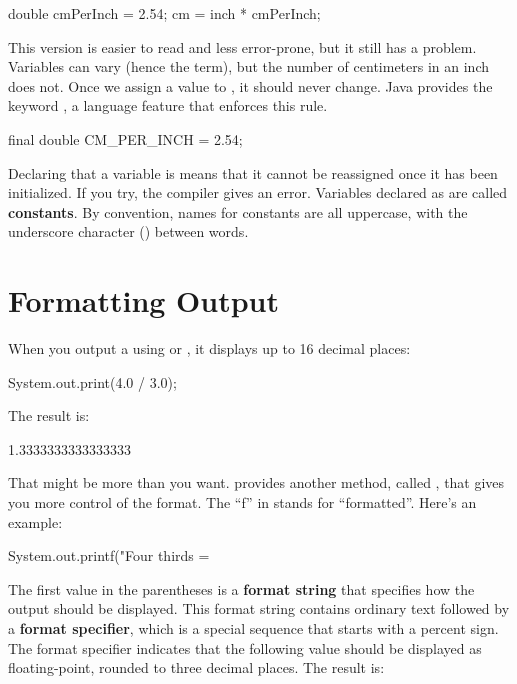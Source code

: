\begin{code}
double cmPerInch = 2.54;
cm = inch * cmPerInch;
\end{code}

This version is easier to read and less error-prone, but it still has a problem.
Variables can vary (hence the term), but the number of centimeters in an inch does not.
Once we assign a value to , it should never change.
Java provides the keyword , a language feature that enforces this rule.

\begin{code}
final double CM_PER_INCH = 2.54;
\end{code}


Declaring that a variable is  means that it cannot be reassigned once it has been initialized.
If you try, the compiler gives an error.
Variables declared as  are called {\bf constants}.
By convention, names for constants are all uppercase, with the underscore character (\java{_}) between words.


\section{Formatting Output}
\label{printf}

When you output a  using  or , it displays up to 16 decimal places:

\begin{code}
System.out.print(4.0 / 3.0);
\end{code}

The result is:

\begin{stdout}
1.3333333333333333
\end{stdout}


That might be more than you want.
 provides another method, called , that gives you more control of the format.
The ``f'' in  stands for ``formatted''.
Here's an example:

\begin{code}
System.out.printf("Four thirds = %
\end{code}


The first value in the parentheses is a {\bf format string} that specifies how the output should be displayed.
This format string contains ordinary text followed by a {\bf format specifier}, which is a special sequence that starts with a percent sign.
The format specifier  indicates that the following value should be displayed as floating-point, rounded to three decimal places.
The result is:

